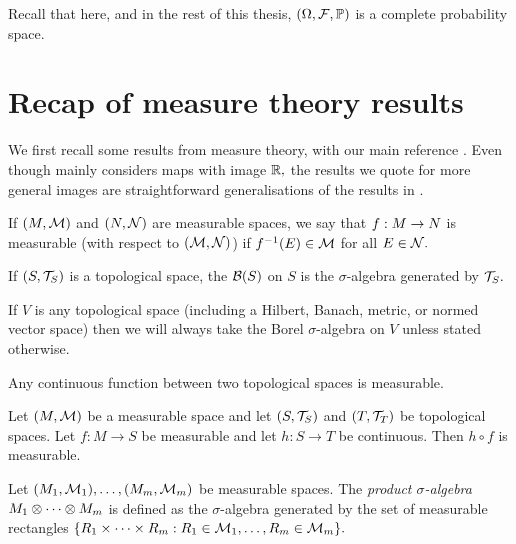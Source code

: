 Recall that here, and in the rest of this thesis, $\OFP$ is a complete probability space.

\section{Recap of measure theory results}

We first recall some results from measure theory, with our main reference \cite{Bo:07}. Even though \cite{Bo:07} mainly considers maps with image $\mathbb R,$ the results we quote for more general images are straightforward generalisations of the results in \cite{Bo:07}.

\begin{definition}\label{def:meas}
If $(M,\mathcal M)$ and $(N,\mathcal N)$ are measurable spaces, we say that $f:M\rightarrow N$ is measurable (with respect to $(\mathcal M,\mathcal N)$) if $f^{-1}(E) \in \mathcal M$ for all $E \in \mathcal N.$
\end{definition}



\label{def:borelsigma}
If $(S,\mathcal T_{S})$ is a topological space, the  $\Borel{S}$ on $S$ is the $\sigma$-algebra generated by $\mathcal T_{S}.$
\ede


If $V$ is any topological space (including a Hilbert, Banach, metric, or normed vector space) then we will always take the Borel $\sigma$-algebra on $V$ unless stated otherwise.


 \label{lem:contmeas}
Any continuous function between two topological spaces is measurable.
\ele





\ble[The composition of a measurable map with a continuous map is measurable {\cite[Text at the top of p. 146]{Bo:07}}]%
Let $(M,\mathcal M)$ be a measurable space and let $\mleft(S,\TS\mright)$ and $\mleft(T,\TopT\mright)$ be topological spaces. Let $f:M \rightarrow S$ be measurable and let $h : S \rightarrow T$ be continuous. Then $h \circ f$ is measurable.\label{lem:contplusmeas}
\ele

\label{def:prodsigma}
Let $\mleft(\M_1,\FM_1\mright),\ldots,\mleft(\M_m,\FM_m\mright)$ be measurable spaces. The \emph{product $\sigma$-algebra} $M_1\otimes\cdots\otimes M_m$ is defined as the $\sigma$-algebra generated by the set of measurable rectangles
$%
\set{R_{1} \times \cdots \times R_m  \st R_{1} \in \FM_1, \ldots, R_m \in \FM_m}.
$
\ede

